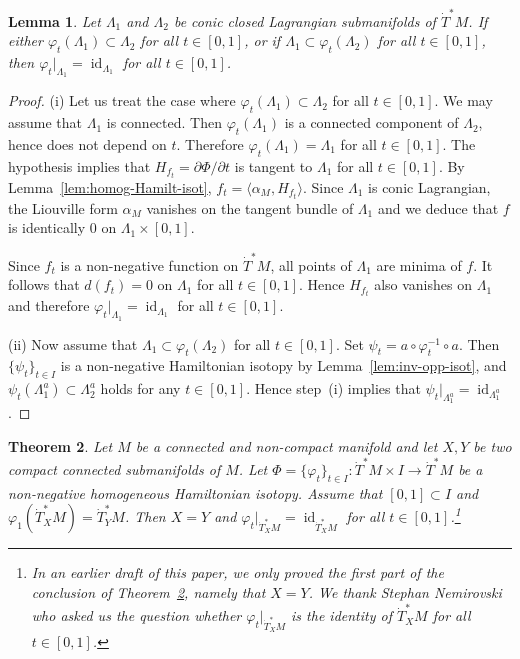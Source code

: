 \documentclass[12pt,leqno]{article}
\newtheorem{theorem}{Theorem}[section]
\newtheorem{lemma}[theorem]{Lemma}
\theoremstyle{definition}
\def\phi{{\varphi}}
\renewcommand{\to}[1][]{\xrightarrow[]{#1}}
\newcommand{\cl}{\colon}
\DeclareMathOperator{\id}{id}
\newcommand{\dT}{{\dot{T}}}
\newcommand{\dTM}{{\dT}^*M}
\numberwithin{equation}{section}
\begin{document}
\begin{lemma}\label{lem:stable-trivial}
Let $\Lambda_1$ and $\Lambda_2$ be conic closed Lagrangian submanifolds of
$\dT^*M$. If either $\phi_t(\Lambda_1)\subset \Lambda_2$ for all
$t\in[0,1]$, or if $\Lambda_1\subset \phi_t(\Lambda_2)$ for all
$t\in[0,1]$, then $\phi_t|_{\Lambda_1} = \id_{\Lambda_1}$ for all $t\in[0,1]$.
\end{lemma}
\begin{proof}
(i) Let us treat the case where $\phi_t(\Lambda_1)\subset \Lambda_2$ for all $t\in[0,1]$.
 We may assume that $\Lambda_1$ is connected.
Then
$\phi_t(\Lambda_1)$ is a connected component of $\Lambda_2$, hence
does not depend on $t$.
Therefore $\phi_t(\Lambda_1)=\Lambda_1$ for all $t\in[0,1]$.
The hypothesis implies that $H_{f_t} = \partial\Phi/\partial t$ is tangent to
$\Lambda_1$ for all $t\in[0,1]$. By Lemma~\ref{lem:homog-Hamilt-isot},
$f_t = \langle \alpha_M, H_{f_t} \rangle$. 
Since $\Lambda_1$ is conic Lagrangian, the Liouville form $\alpha_M$ vanishes
on the tangent bundle of $\Lambda_1$ and we deduce that $f$ is identically $0$
on $\Lambda_1\times [0,1]$.

Since  $f_t$ is a non-negative function on $\dTM$, all points of 
$\Lambda_1$ are minima of $f$. It follows that $d(f_t) = 0$ on $\Lambda_1$ for all $t\in[0,1]$.
Hence $H_{f_t}$ also vanishes on $\Lambda_1$ and therefore
$\phi_t|_{\Lambda_1} = \id_{\Lambda_1}$ for all $t\in[0,1]$.

\noindent
(ii) Now assume that $\Lambda_1\subset\phi_t(\Lambda_2)$ for all $t\in[0,1]$. 
Set $\psi_t=a\circ\phi_t^{-1}\circ a$.
Then $\{\psi_t\}_{t\in I}$ is a non-negative Hamiltonian isotopy
by Lemma~\ref{lem:inv-opp-isot},
and $\psi_t(\Lambda_1^a)\subset\Lambda_2^a$ holds for any $t\in [0,1]$.
Hence step~(i) implies that $\psi_t\vert_{\Lambda_1^a}=\id_{\Lambda_1^a}$.
\end{proof}

\begin{theorem}\label{th:positiso}
Let $M$ be a connected and non-compact manifold and let $X,Y$ be two compact
connected submanifolds of $M$.  
Let $\Phi=\{\phi_t\}_{t\in I}\cl\dT^*M\times I\to\dT^*M$ be
a non-negative homogeneous Hamiltonian isotopy.
Assume that $[0,1]\subset I$ and $\phi_1(\dT^*_XM)=\dT^*_YM$. Then $X=Y$ and 
$\phi_t|_{\dT^*_XM} = \id_{\dT^*_XM}$ for all $t\in[0,1]$.\footnote{
In an earlier draft of this paper, we only proved the first part of the
conclusion of Theorem~\ref{th:positiso}, namely that $X=Y$. We 
thank Stephan Nemirovski who asked us the question whether 
$\phi_t\vert_{\dT^*_XM}$ is the identity of $\dT^*_XM$ for all $t\in[0,1]$.
}
\end{theorem}
\end{document}
